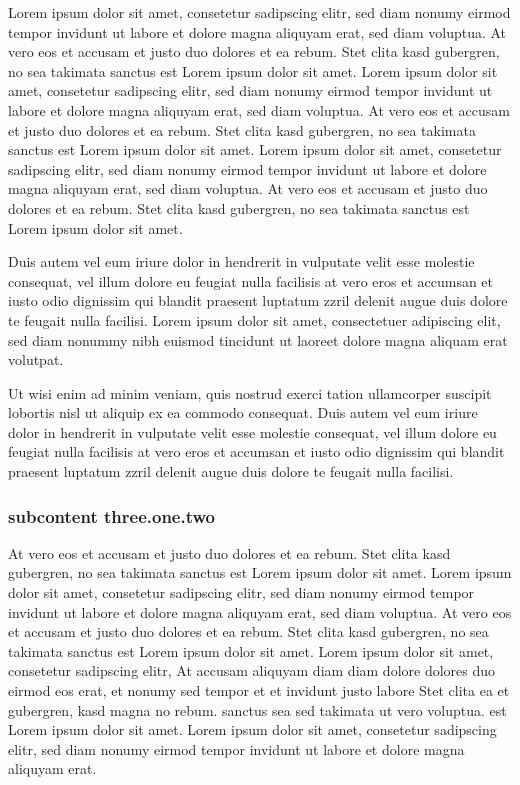 Lorem ipsum dolor sit amet, consetetur sadipscing elitr, sed diam nonumy eirmod
tempor invidunt ut labore et dolore magna aliquyam erat, sed diam voluptua. At
vero eos et accusam et justo duo dolores et ea rebum. Stet clita kasd gubergren,
no sea takimata sanctus est Lorem ipsum dolor sit amet. Lorem ipsum dolor sit
amet, consetetur sadipscing elitr, sed diam nonumy eirmod tempor invidunt ut
labore et dolore magna aliquyam erat, sed diam voluptua. At vero eos et accusam
et justo duo dolores et ea rebum. Stet clita kasd gubergren, no sea takimata
sanctus est Lorem ipsum dolor sit amet. Lorem ipsum dolor sit amet, consetetur
sadipscing elitr, sed diam nonumy eirmod tempor invidunt ut labore et dolore
magna aliquyam erat, sed diam voluptua. At vero eos et accusam et justo duo
dolores et ea rebum. Stet clita kasd gubergren, no sea takimata sanctus est
Lorem ipsum dolor sit amet.

Duis autem vel eum iriure dolor in hendrerit in vulputate velit esse molestie
consequat, vel illum dolore eu feugiat nulla facilisis at vero eros et accumsan
et iusto odio dignissim qui blandit praesent luptatum zzril delenit augue duis
dolore te feugait nulla facilisi. Lorem ipsum dolor sit amet, consectetuer
adipiscing elit, sed diam nonummy nibh euismod tincidunt ut laoreet dolore magna
aliquam erat volutpat.

Ut wisi enim ad minim veniam, quis nostrud exerci tation ullamcorper suscipit
lobortis nisl ut aliquip ex ea commodo consequat. Duis autem vel eum iriure
dolor in hendrerit in vulputate velit esse molestie consequat, vel illum dolore
eu feugiat nulla facilisis at vero eros et accumsan et iusto odio dignissim qui
blandit praesent luptatum zzril delenit augue duis dolore te feugait nulla
facilisi.

 \subsubsection{subcontent three.one.two}   

At vero eos et accusam et justo duo dolores et ea rebum. Stet clita kasd
gubergren, no sea takimata sanctus est Lorem ipsum dolor sit amet. Lorem ipsum
dolor sit amet, consetetur sadipscing elitr, sed diam nonumy eirmod tempor
invidunt ut labore et dolore magna aliquyam erat, sed diam voluptua. At vero eos
et accusam et justo duo dolores et ea rebum. Stet clita kasd gubergren, no sea
takimata sanctus est Lorem ipsum dolor sit amet. Lorem ipsum dolor sit amet,
consetetur sadipscing elitr, At accusam aliquyam diam diam dolore dolores duo
eirmod eos erat, et nonumy sed tempor et et invidunt justo labore Stet clita ea
et gubergren, kasd magna no rebum. sanctus sea sed takimata ut vero voluptua.
est Lorem ipsum dolor sit amet. Lorem ipsum dolor sit amet, consetetur
sadipscing elitr, sed diam nonumy eirmod tempor invidunt ut labore et dolore
magna aliquyam erat.

